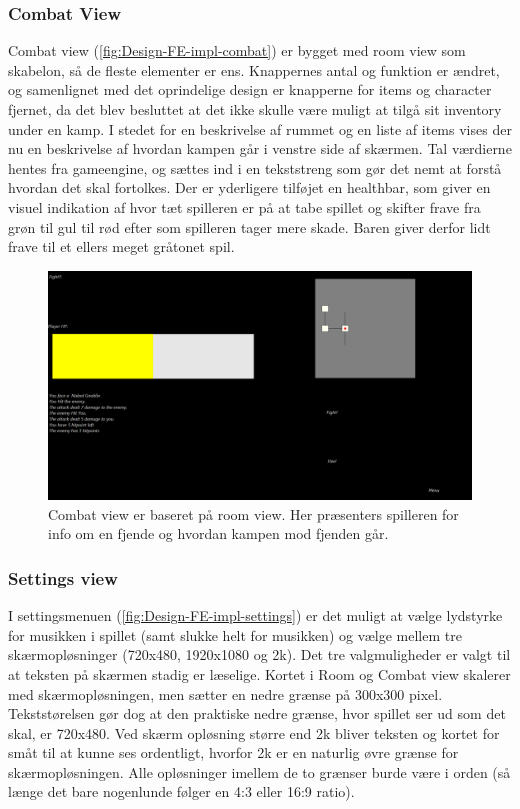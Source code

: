 \subsubsection{Combat View}

Combat view (\autoref{fig:Design-FE-impl-combat}) er bygget med room view som skabelon, så de fleste elementer er ens. Knappernes antal og funktion er ændret, og samenlignet med det oprindelige design er knapperne for items og character fjernet, da det blev besluttet at det ikke skulle være muligt at tilgå sit inventory under en kamp. I stedet for en beskrivelse af rummet og en liste af items vises der nu en beskrivelse af hvordan kampen går i venstre side af skærmen. Tal værdierne hentes fra gameengine, og sættes ind i en tekststreng som gør det nemt at forstå hvordan det skal fortolkes. Der er yderligere tilføjet en healthbar, som giver en visuel indikation af hvor tæt spilleren er på at tabe spillet og skifter frave fra grøn til gul til rød efter som spilleren tager mere skade. Baren giver derfor lidt frave til et ellers meget gråtonet spil.

\begin{figure}[h]
\centering
\includegraphics[width = \textwidth]{02-Body/Images/combat_final.PNG}
\caption{Combat view er baseret på room view. Her præsenters spilleren for info om en fjende og hvordan kampen mod fjenden går.}
\label{fig:Design-FE-impl-combat}
\end{figure}

\subsubsection{Settings view}

I settingsmenuen (\autoref{fig:Design-FE-impl-settings}) er det muligt at vælge lydstyrke for musikken i spillet (samt slukke helt for musikken) og vælge mellem tre skærmopløsninger (720x480, 1920x1080 og 2k). Det tre valgmuligheder er valgt til at teksten på skærmen stadig er læselige. Kortet i Room og Combat view skalerer med skærmopløsningen, men sætter en nedre grænse på 300x300 pixel. Tekststørelsen gør dog at den praktiske nedre grænse, hvor spillet ser ud som det skal, er 720x480. Ved skærm opløsning større end 2k bliver teksten og kortet for småt til at kunne ses ordentligt, hvorfor 2k er en naturlig øvre grænse for skærmopløsningen. Alle opløsninger imellem de to grænser burde være i orden (så længe det bare nogenlunde følger en 4:3 eller 16:9 ratio).\\

